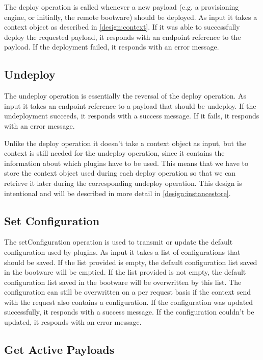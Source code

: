 The deploy operation is called whenever a new payload (e.g. a provisioning engine, or initially, the remote bootware) should be deployed.
As input it takes a context object as described in \autoref{design:context}.
If it was able to successfully deploy the requested payload, it responds with an endpoint reference to the payload.
If the deployment failed, it responds with an error message.

\subsection{Undeploy}

The undeploy operation is essentially the reversal of the deploy operation.
As input it takes an endpoint reference to a payload that should be undeploy.
If the undeployment succeeds, it responds with a success message.
If it fails, it responds with an error message.

Unlike the deploy operation it doesn't take a context object as input, but the context is still needed for the undeploy operation, since it contains the information about which plugins have to be used.
This means that we have to store the context object used during each deploy operation so that we can retrieve it later during the corresponding undeploy operation.
This design is intentional and will be described in more detail in \autoref{design:instancestore}.

\subsection{Set Configuration}

The setConfiguration operation is used to transmit or update the default configuration used by plugins.
As input it takes a list of configurations that should be saved.
If the list provided is empty, the default configuration list saved in the bootware will be emptied.
If the list provided is not empty, the default configuration list saved in the bootware will be overwritten by this list.
The configuration can still be overwritten on a per request basis if the context send with the request also contains a configuration.
If the configuration was updated successfully, it responds with a success message.
If the configuration couldn't be updated, it responds with an error message.

\subsection{Get Active Payloads}

